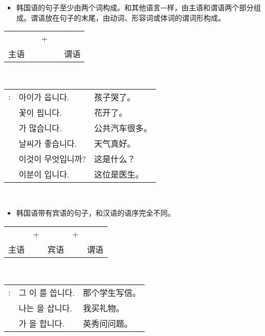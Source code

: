 \begin{grammar}
    \begin{grammarsect}[句子结构]
    \begin{itemize}
        \item 韩国语的句子至少由两个词构成。和其他语言ᅳ样，由主语和谓语两个部分组成。谓语放在句子的末尾，由动词、形容词或体词的谓词形构成。
    \end{itemize}
    \begin{center}
    \begin{tabular}{lllll}
        \kr \ruby{主語}{주어}&\qquad&+&\qquad&\kr \ruby{敘述語}{서술어}\\
        主语&\qquad&&\qquad&谓语
    \end{tabular}\\
    \end{center}
    \begin{tabular}{lll}
        \kr \ruby{例}{예}: &\kr 아이가 웁니다.&孩子哭了。\\
        &\kr 꽃이 핍니다.&花开了。\\
        &\kr \ruby{버스}{bus}가 많습니다.&公共汽车很多。\\
        &\kr 날씨가 좋습니다.&天气真好。\\
        &\kr 이것이 무엇입니까?&这是什么？\\
        &\kr 이분이 \ruby{醫師}{의사}입니다.&这位是医生。
    \end{tabular}\\
    \end{grammarsect}
    \begin{itemize}
        \item 韩国语带有宾语的句子，和汉语的语序完全不同。
    \end{itemize}
    \begin{center}
    \begin{tabular}{lllll}
        \kr \ruby{主語}{주어}&+&\kr \ruby{目的語}{목적어}&+&\kr \ruby{敘述語}{서술어}\\
        主语&&宾语&&谓语
    \end{tabular}\\
    \end{center}
    \begin{tabular}{lll}
        \kr \ruby{例}{예}: &\kr 그 \ruby{學生}{학생}이 \ruby{便紙}{편지}를 씁니다.&那个学生写信。\\
        &\kr 나는 \ruby{膳物}{선물}을 삽니다.&我买礼物。\\
        &\kr \ruby{英秀}{영수}가 \ruby{質問}{질문}을 합니다.&英秀问问题。
    \end{tabular}\\
\end{grammar}
